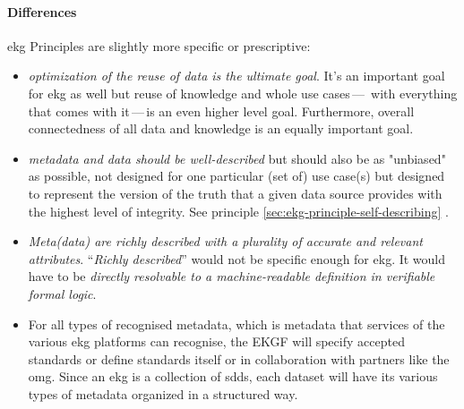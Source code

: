 \paragraph{Differences}

\gls{ekg} Principles are slightly more specific or prescriptive:

\begin{itemize}
    \item \textit{optimization of the reuse of data is the ultimate goal}.
          It's an important goal for \gls{ekg} as well but reuse of knowledge and whole use cases\,---\,%
          with everything that comes with it\,---\,is an even higher level goal.
          Furthermore, overall connectedness of all data and knowledge is an equally important goal.
    \item \textit{metadata and data should be well-described} but should also be as "unbiased" as possible, not designed
          for one particular (set of) use case(s) but designed to represent the version of the truth that a given data
          source provides with the highest level of integrity.
          See principle \ref{sec:ekg-principle-self-describing} .
    \item \textit{Meta(data) are richly described with a plurality of accurate and relevant attributes}.
          \enquote{\textit{Richly described}} would not be specific enough for \gls{ekg}.
          It would have to be \textit{directly resolvable to a machine-readable definition in verifiable formal logic}.
    \item For all types of recognised metadata, which is metadata that services of the various \gls{ekg} platforms can
          recognise, the EKGF will specify accepted standards or define standards itself or in
          collaboration with partners like the \gls{omg}.
          Since an \gls{ekg} is a collection of \glspl{sdd}, each dataset will have its various types of metadata
          organized in a structured way.
\end{itemize}

